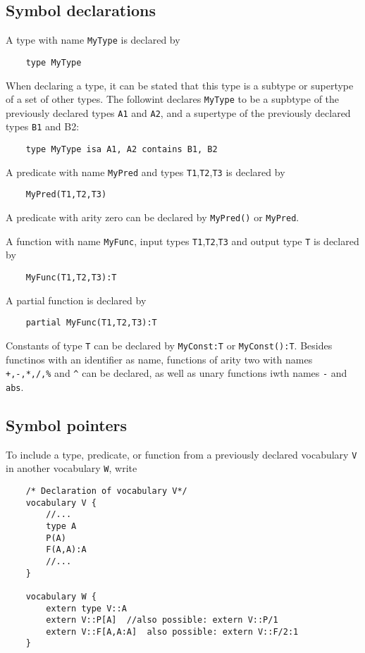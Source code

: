 \documentclass[a4]{article}
\newcommand{\code}[1]{{\tt #1}}
\begin{document}
\subsection{Symbol declarations}
\label{ssec:symbols}
A type with name \code{MyType} is declared by
\begin{lstlisting}
	type MyType
\end{lstlisting}
When declaring a type, it can be stated that this type is a subtype or supertype of a set of other types.  The followint declares \code{MyType} to be a supbtype of the previously declared types \code{A1} and \code{A2}, and a supertype of the previously declared types \code{B1} and {B2}:
\begin{lstlisting}
	type MyType isa A1, A2 contains B1, B2
\end{lstlisting}
A predicate with name \code{MyPred} and types \code{T1},\code{T2},\code{T3} is declared by
\begin{lstlisting}
	MyPred(T1,T2,T3)
\end{lstlisting}

A predicate with arity zero can be declared by \code{MyPred()} or \code{MyPred}.

A function with name \code{MyFunc}, input types \code{T1},\code{T2},\code{T3} and output type \code{T}  is declared by
\begin{lstlisting}
	MyFunc(T1,T2,T3):T
\end{lstlisting}

A partial function is declared by 
\begin{lstlisting}
	partial MyFunc(T1,T2,T3):T
\end{lstlisting}

Constants of type \code{T} can be declared by \code{MyConst:T} or \code{MyConst():T}.  Besides functinos with an identifier as name, functions of arity two with names \code{+,-,*,/,\%}  and \code{\textasciicircum} can be declared, as well as unary functions iwth names \code{-} and \code{abs}.



\subsection{Symbol pointers}

To include a type, predicate, or function from a previously declared vocabulary \code{V} in another vocabulary \code{W}, write
\begin{lstlisting}
	/* Declaration of vocabulary V*/
	vocabulary V {
		//...
		type A
		P(A)
		F(A,A):A
		//...
	}

	vocabulary W {
		extern type V::A
		extern V::P[A]	//also possible: extern V::P/1
		extern V::F[A,A:A]	also possible: extern V::F/2:1
	}
\end{lstlisting}
\end{document}
